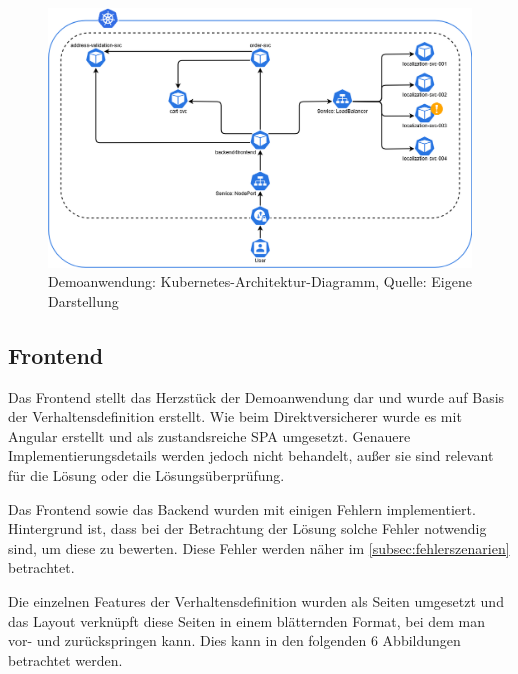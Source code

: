 
\begin{figure}[H]
	\centering
	\includegraphics[width=1.0\linewidth]{img/04_erstellung-poc/demoanwendung_k8s-deployment.png}
	\caption{Demoanwendung: Kubernetes-Architektur-Diagramm, Quelle: Eigene Darstellung}
	\label{fig:demoanwendung_k8s-deployment}
\end{figure}

\subsection{Frontend}

Das Frontend stellt das Herzstück der Demoanwendung dar und wurde auf Basis der Verhaltensdefinition erstellt. Wie beim Direktversicherer wurde es mit Angular erstellt und als zustandsreiche SPA umgesetzt. Genauere Implementierungsdetails werden jedoch nicht behandelt, außer sie sind relevant für die Lösung oder die Lösungsüberprüfung.

Das Frontend sowie das Backend wurden mit einigen Fehlern implementiert. Hintergrund ist, dass bei der Betrachtung der Lösung solche Fehler notwendig sind, um diese zu bewerten. Diese Fehler werden näher im \autoref{subsec:fehlerszenarien} betrachtet.

Die einzelnen Features der Verhaltensdefinition wurden als Seiten umgesetzt und das Layout verknüpft diese Seiten in einem blätternden Format, bei dem man vor- und zurückspringen kann. Dies kann in den folgenden 6 Abbildungen betrachtet werden.

